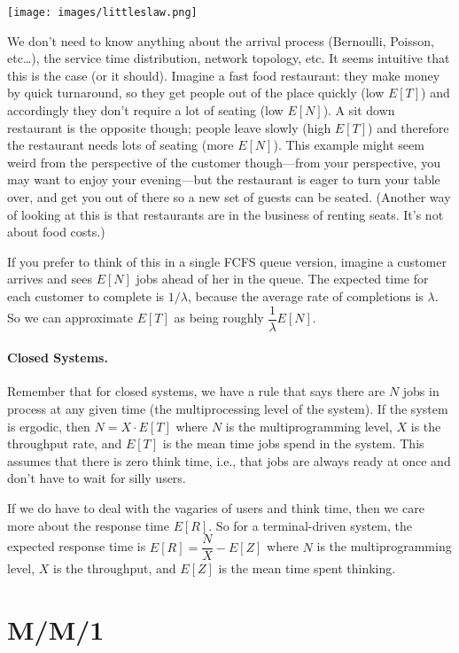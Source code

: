 \documentclass[a4paper]{report}
\begin{document}
\begin{center}
	\texttt{[image: images/littleslaw.png]}
\end{center}

We don't need to know anything about the arrival process (Bernoulli, Poisson, etc\ldots), the service time distribution, network topology, etc. It seems intuitive that this is the case (or it should). Imagine a fast food restaurant: they make money by quick turnaround, so they get people out of the place quickly (low $E[T]$) and accordingly they don't require a lot of seating (low $E[N]$). A sit down restaurant is the opposite though; people leave slowly (high $E[T]$) and therefore the restaurant needs lots of seating (more $E[N]$). This example might seem weird from the perspective of the customer though---from your perspective, you may want to enjoy your evening---but the restaurant is eager to turn your table over, and get you out of there so a new set of guests can be seated. (Another way of looking at this is that restaurants are in the business of renting seats. It's not about food costs.)

If you prefer to think of this in a single FCFS queue version, imagine a customer arrives and sees $E[N]$ jobs ahead of her in the queue. The expected time for each customer to complete is $1/\lambda$, because the average rate of completions is $\lambda $. So we can approximate $E[T]$ as being roughly $\dfrac{1}{\lambda}E[N]$.

\paragraph{Closed Systems.} Remember that for closed systems, we have a rule that says there are $N$ jobs in process at any given time (the multiprocessing level of the system). If the system is ergodic, then $N = X \cdot E[T]$ where $N$ is the multiprogramming level, $X$ is the throughput rate, and $E[T]$ is the mean time jobs spend in the system. This assumes that there is zero think time, i.e., that jobs are always ready at once and don't have to wait for silly users.

If we do have to deal with the vagaries of users and think time, then we care more about the response time $E[R]$. So for a terminal-driven system, the expected response time is $E[R] = \dfrac{N}{X} - E[Z]$ where $N$ is the multiprogramming level, $X$ is the throughput, and $E[Z]$ is the mean time spent thinking. 

\section*{M/M/1}
\end{document}
